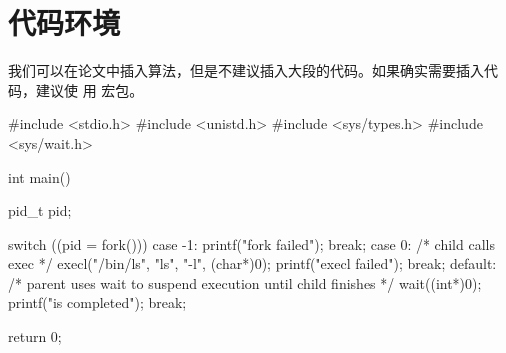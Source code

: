 \section{代码环境}

我们可以在论文中插入算法，但是不建议插入大段的代码。如果确实需要插入代码，建议使
用  宏包。

\begin{codeblock}[language=C]
#include <stdio.h>
#include <unistd.h>
#include <sys/types.h>
#include <sys/wait.h>

int main() {
  pid_t pid;

  switch ((pid = fork())) {
  case -1:
    printf("fork failed\n");
    break;
  case 0:
    /* child calls exec */
    execl("/bin/ls", "ls", "-l", (char*)0);
    printf("execl failed\n");
    break;
  default:
    /* parent uses wait to suspend execution until child finishes */
    wait((int*)0);
    printf("is completed\n");
    break;
  }

  return 0;
}
\end{codeblock}
